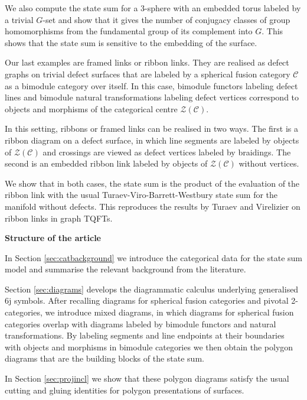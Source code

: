 \documentclass[1.5pt, a4paper]{article}
\newcommand{\mac}{\mathcal C}
\begin{document}
We also compute the state sum for a 3-sphere with an embedded torus labeled by a trivial $G$-set and show that it gives the number of conjugacy classes of group homomorphisms from the fundamental group of its complement into $G$. This shows that the state sum is sensitive to the embedding of the surface. 

Our last  examples are framed links or ribbon links. They are  realised as defect graphs on trivial defect surfaces that are  labeled by a spherical fusion category $\mac$ as a bimodule category over itself. In this case,  bimodule functors labeling  defect lines and bimodule natural transformations labeling defect vertices correspond to objects and morphisms of the categorical centre $\mathcal Z(\mac)$. 

 In this setting, ribbons or framed links 
 can be realised in two ways. The first is a ribbon diagram on a defect surface, in which line segments are labeled by objects of $\mathcal Z(\mac)$ and crossings are viewed as defect vertices labeled by braidings. The second is an embedded ribbon link  labeled  by objects of $\mathcal Z(\mac)$ without  vertices. 
 
 We show that in both cases, the state sum is the product of the evaluation of the ribbon link with the usual Turaev-Viro-Barrett-Westbury state sum for the manifold without  defects.
This reproduces the results by Turaev and Virelizier \cite{TVr, TVbook} on  ribbon links in graph TQFTs. 



 \medskip
 {\bf Structure of the article}
 
In Section \ref{sec:catbackground} we introduce the categorical data for the state sum model and summarise the relevant background from the literature. 

Section \ref{sec:diagrams} develops the diagrammatic calculus underlying generalised 6j symbols. After recalling diagrams for spherical fusion categories and  pivotal 2-categories, we introduce mixed diagrams, in which diagrams for spherical fusion categories overlap with diagrams 
labeled by bimodule functors and  natural transformations. 
By labeling   segments and line endpoints at their boundaries with objects and morphisms in bimodule categories we then obtain the polygon diagrams that are the building blocks of the state sum. 

In Section \ref{sec:projincl} we show that these polygon diagrams satisfy the usual  cutting and gluing identities for polygon presentations of surfaces.
\end{document}
